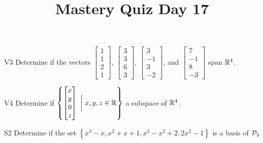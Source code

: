 \documentclass{sbgLAquiz}
\title{Mastery Quiz Day 17 }
\begin{document}
\begin{problem}{V3}
Determine if the vectors $\begin{bmatrix} 1 \\ 1 \\ 2 \\1 \end{bmatrix}$, $\begin{bmatrix} 3 \\ 3 \\ 6 \\ 3 \end{bmatrix}$, $\begin{bmatrix}3 \\ -1 \\ 3 \\ -2\end{bmatrix}$, and $\begin{bmatrix} 7 \\ -1 \\ 8 \\ -3 \end{bmatrix}$  span $\IR^4$.
\end{problem}

\begin{problem}{V4}
Determine if $\left\{ \begin{bmatrix} x \\ y \\ 0 \\ z \end{bmatrix}\  \bigg|\ x,y,z \in \IR\right\}$  a subspace of $\IR^4$.
\end{problem}
\newpage

\begin{problem}{S2}
Determine if the set $\left\{ x^3-x, x^2+x+1, x^3-x^2+2, 2x^2-1 \right\}$ is a basis of $\P_3$
\end{problem}
\end{document}
